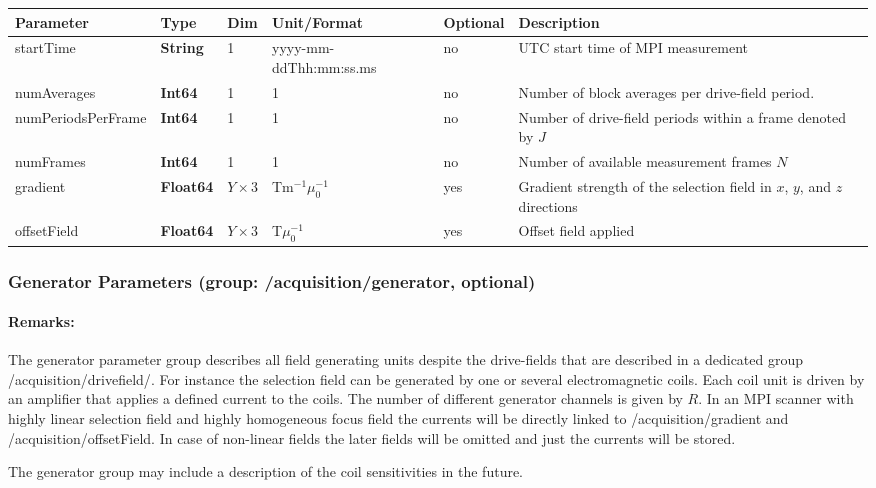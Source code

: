 \documentclass[landscape,a4paper]{article} %
\newcommand{\inltab}[1]{{\ttfamily\bfseries\color{blue}#1}}
\newcommand{\inlvar}[1]{{\ttfamily#1}}
\begin{document}
\noindent \begin{tabularx}{\columnwidth}{lllllX}
\textbf{Parameter} & \textbf{Type} & \textbf{Dim} & \textbf{Unit/Format} & \textbf{Optional} & \textbf{Description} \\ \hline
\inlvar{startTime} & \inltab{String} & 1 & yyyy-mm-ddThh:mm:ss.ms & no & UTC start time of MPI measurement \\ \hline
\inlvar{numAverages} & \inltab{Int64} & 1 & 1& no & Number of block averages per drive-field period. \\ \hline
\inlvar{numPeriodsPerFrame} & \inltab{Int64} & 1 & 1 & no & Number of drive-field periods within a frame denoted by $J$ \\ \hline
\inlvar{numFrames} & \inltab{Int64} & 1 & 1& no & Number of available measurement frames $N$ \\ \hline
\inlvar{gradient} & \inltab{Float64} & $Y \times 3$ & Tm$^{-1}\mu_0^{-1}$ & yes & Gradient strength of the selection field in $x$, $y$, and $z$ directions \\ \hline
\inlvar{offsetField} & \inltab{Float64} & $Y \times 3$ & T$\mu_0^{-1}$ & yes & Offset field applied  \\ \hline


\end{tabularx}

\subsubsection{Generator Parameters (group: \inlvar{/acquisition/generator}, optional)}

\begin{multicols}{2}
\paragraph{Remarks:} The generator parameter group describes all field generating units despite the drive-fields that are described in a dedicated group \inlvar{/acquisition/drivefield/}. For instance the selection field can be generated by one or several electromagnetic coils. Each coil unit is driven by an amplifier that applies a defined current to the coils. The number of different generator channels is given by $R$. In an MPI scanner with highly linear selection field and highly homogeneous focus field the currents will be directly linked to \inlvar{/acquisition/gradient} and \inlvar{/acquisition/offsetField}. In case of non-linear fields the later fields will be omitted and just the currents will be stored.

The generator group may include a description of the coil sensitivities in the future.

\end{multicols}
\end{document}
